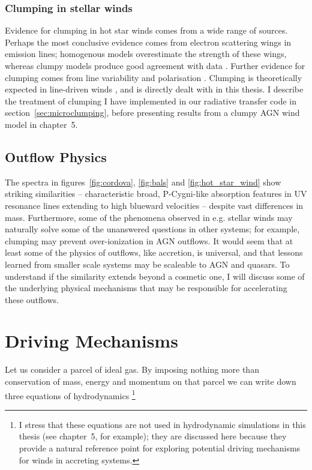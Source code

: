 \subsubsection{Clumping in stellar winds}

Evidence for clumping in hot star winds comes from a wide range of sources.
Perhaps the most conclusive evidence comes from electron scattering wings
in emission lines; homogenous models overestimate the strength of these
wings, whereas clumpy models produce good agreement with data 
\citep{hillier1984,hillier1991eswingsmodel,hamann1992wr,hamann1994,schmutz1997}.
Further evidence for clumping comes from line variability \citep{prinja1992}
and polarisation \citep{brown1995}. Clumping is theoretically expected
in line-driven winds 
\citep[see section~\ref{sec:line_driving} and the review by][]{owocki2014}, 
and is directly dealt with in this thesis.
I describe the treatment of clumping I have implemented in our radiative 
transfer code in section~\ref{sec:microclumping}, before presenting
results from a clumpy AGN wind model in chapter~5.

\subsection{Outflow Physics}

The spectra in figures~\ref{fig:cordova}, \ref{fig:bals}
and \ref{fig:hot_star_wind} show striking similarities -- 
characteristic broad, P-Cygni-like absorption features in UV resonance
lines extending to high blueward velocities -- despite vast differences in mass. 
Furthermore, some of the phenomena observed in e.g. stellar winds may naturally solve some of 
the unanswered questions in other systems; for example, clumping
may prevent over-ionization in AGN outflows. It would seem
that at least some of the physics of outflows, like accretion,
is universal, and that lessons learned from smaller scale systems may be
scaleable to AGN and quasars. To understand if the similarity extends beyond
a cosmetic one, I will discuss some of the 
underlying physical mechanisms that may be responsible for accelerating
these outflows.

\section{Driving Mechanisms}

Let us consider a parcel of ideal gas. By imposing nothing more than
conservation of mass, energy and momentum on that parcel we can write down
three equations of hydrodynamics
\footnote{I stress that these equations are not used in hydrodynamic
simulations in this thesis (see chapter~5, for example); 
they are discussed here because they provide a natural reference point
for exploring potential driving mechanisms for winds in accreting systems.
}

